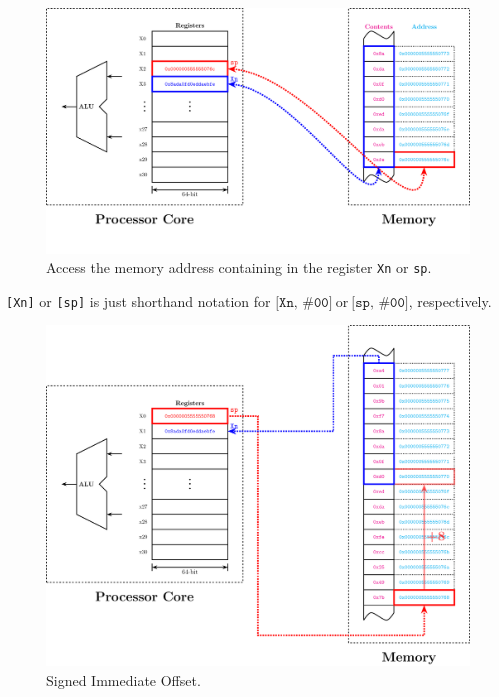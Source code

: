 \begin{figure}[h!]
	\includegraphics[width=\textwidth]{architectures/register-address.pdf}
	\caption{Access the memory address containing in the
		register \texttt{Xn} or \texttt{sp}.}
\end{figure}
\vfill
\begin{remark*}
	\texttt{[Xn]} or \texttt{[sp]} is just shorthand notation for $\texttt{[Xn,\ \#00]}\ \text{or}\ \texttt{[sp,\ \#00]}$, respectively.
\end{remark*}

\newpage
{}
\begin{figure}[h!]
	\includegraphics[width=\textwidth]{architectures/immediate-offset.pdf}
	\caption{Signed Immediate Offset.}
\end{figure}

